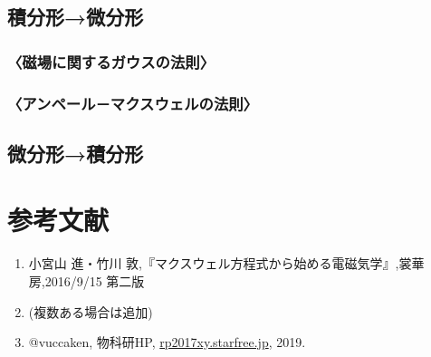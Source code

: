 \documentclass[10pt,b5paper,papersize,dvipdfmx]{jsbook}
\begin{document}
\subsection{積分形→微分形}
\subsubsection{〈磁場に関するガウスの法則〉}

\subsubsection{〈アンペール－マクスウェルの法則〉}

\subsection{微分形→積分形}


\section{参考文献}
\renewcommand{\labelenumi}{[\arabic{enumi}]} %
\begin{enumerate}
\item 小宮山 進・竹川 敦,『マクスウェル方程式から始める電磁気学』,裳華房,2016/9/15 第二版
\item (複数ある場合は追加)
\item @vuccaken, 物科研HP, \url{rp2017xy.starfree.jp}, 2019.
\end{enumerate}
\renewcommand{\labelenumi}{\arabic{enumi}.} %
\end{document}
